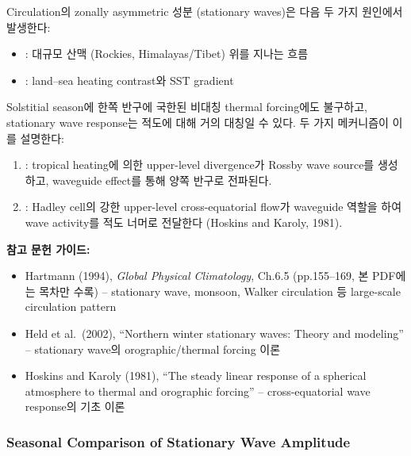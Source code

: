 Circulation의 zonally asymmetric 성분 (stationary waves)은 다음 두 가지 원인에서 발생한다:
\begin{itemize}
\item {}: 대규모 산맥 (Rockies, Himalayas/Tibet) 위를 지나는 흐름
\item {}: land--sea heating contrast와 SST gradient
\end{itemize}

\begin{remark}
Solstitial season에 한쪽 반구에 국한된 비대칭 thermal forcing에도 불구하고, stationary wave response는 적도에 대해 거의 대칭일 수 있다. 두 가지 메커니즘이 이를 설명한다:
\begin{enumerate}
\item {}: tropical heating에 의한 upper-level divergence가 Rossby wave source를 생성하고, waveguide effect를 통해 양쪽 반구로 전파된다.
\item {}: Hadley cell의 강한 upper-level cross-equatorial flow가 waveguide 역할을 하여 wave activity를 적도 너머로 전달한다 (Hoskins and Karoly, 1981).
\end{enumerate}
\end{remark}

\begin{hisublock}
\textbf{참고 문헌 가이드:}
\begin{itemize}
  \item Hartmann (1994), \textit{Global Physical Climatology}, Ch.6.5 (pp.155--169, 본 PDF에는 목차만 수록) -- stationary wave, monsoon, Walker circulation 등 large-scale circulation pattern
  \item Held et al.\ (2002), ``Northern winter stationary waves: Theory and modeling'' -- stationary wave의 orographic/thermal forcing 이론
  \item Hoskins and Karoly (1981), ``The steady linear response of a spherical atmosphere to thermal and orographic forcing'' -- cross-equatorial wave response의 기초 이론
\end{itemize}
\end{hisublock}


\subsubsection{Seasonal Comparison of Stationary Wave Amplitude}

